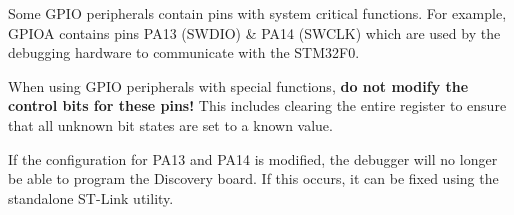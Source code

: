 \documentclass[11pt,fleqn]{book} %
\begin{document}
\begin{warning}
    Some GPIO peripherals contain pins with system critical functions. For example, GPIOA contains pins PA13 (SWDIO) \& PA14 (SWCLK) which are used by the debugging hardware to communicate with the STM32F0. 
    
    When using GPIO peripherals with special functions, \textbf{do not modify the control bits for these pins!} This includes clearing the entire register to ensure that all unknown bit states are set to a known value. 
    
    If the configuration for PA13 and PA14 is modified, the debugger will no longer be able to program the Discovery board. If this occurs, it can be fixed using the standalone ST-Link utility.
\end{warning}
\end{document}
